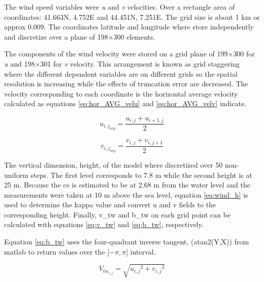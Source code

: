 The wind speed variables were \textit{u} and \textit{v} velocities. Over a rectangle area of coordinates: 41.663\degree N, 4.752\degree E and 44.451\degree N,  7.251\degree  E. The grid size is about 1 km or approx 0.009\degree. The coordinates latitude and longitude where store independently and discretize over a plane of 198$\times$300 elements. \par

The components of the wind velocity were stored on a grid plane of 199$\times$300 for \textit{u} and 198$\times$301 for \textit{v} velocity. This arrangement is known as grid staggering where the different dependent variables are on different grids so the spatial resolution is increasing while the effects of truncation error are decreased. The velocity corresponding to each coordinate is the horizontal average velocity calculated as equations \ref{eq:hor_AVG_velu} and \ref{eq:hor_AVG_velv} indicate.  \par  

\begin{equation} \label{eq:hor_AVG_velu}
    u_{{i,j}_{avg}}=\frac{ u_{i,j} + u_{{i+1},j} } {2}
\end{equation}

\begin{equation} \label{eq:hor_AVG_velv}
    v_{{i,j}_{avg}}=\frac{ v_{i,j} + v_{i,{j+1}} } {2}
\end{equation}

The vertical dimension, height, of the model where discretized over 50 non-uniform steps. The first level corresponds to 7.8 m while the second height is at 25 m. Because the \acrshort{ce} is estimated to be at 2.68 m from the water level \cite{pennanen2015optimal} and the measurements were taken at 10 m above the sea level, equation \ref{eq:wind_h} is used to determine the \acrshort{kappa} value and convert \acrshort{u} and \acrshort{v} fields to the corresponding height. Finally, \acrshort{v_tw} and \acrshort{b_tw} on each grid point can be calculated with equations \ref{eq:v_tw} and \ref{eq:b_tw}, respectively. \par \noindent Equation \ref{eq:b_tw} uses the four-quadrant inverse tangent, (atan2(Y,X)) from \acrshort{matlab} to return values over the [$- \pi, \pi  $] interval.\par 

\begin{equation}\label{eq:v_tw}
    V_{tw_{i,j}}=\sqrt{{u_{i,j}}^2+{v_{i,j}}^2}
\end{equation}

